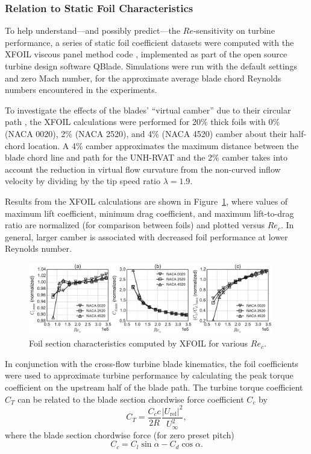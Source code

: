 \documentclass[energies,article,accept,moreauthors,pdftex,12pt,a4paper]{mdpi}
\begin{document}
\subsubsection{Relation to Static Foil Characteristics}

To help understand---and possibly predict---the $Re$-sensitivity on turbine
performance, a series of static foil coefficient datasets were computed with the
XFOIL viscous panel method code \cite{Drela1989}, implemented as part of the
open source turbine design software QBlade. Simulations were run with the
default settings and zero Mach number, for the approximate average blade chord
Reynolds numbers encountered in the experiments.

To investigate the effects of the blades' ``virtual camber'' due to their
circular path \cite{Migliore1980}, the XFOIL calculations were performed for
20\% thick foils with 0\% (NACA 0020), 2\% (NACA 2520), and 4\% (NACA 4520)
camber about their half-chord location. A 4\% camber approximates the maximum
distance between the blade chord line and path for the UNH-RVAT and the 2\%
camber takes into account the reduction in virtual flow curvature from the
non-curved inflow velocity by dividing by the tip speed ratio $\lambda=1.9$.

Results from the XFOIL calculations are shown in Figure~\ref{fig:foil-Re-dep},
where values of maximum lift coefficient, minimum drag coefficient, and maximum
lift-to-drag ratio are normalized (for comparison between foils) and plotted
versus $Re_c$. In general, larger camber is associated with decreased foil
performance at lower Reynolds number.

\begin{figure}[ht]
\centering
\includegraphics[width=0.95\textwidth]{figures/all_foils_re_dep}
\caption{Foil section characteristics computed by XFOIL for various $Re_c$.}
\label{fig:foil-Re-dep}
\end{figure}

In conjunction with the cross-flow turbine blade kinematics, the foil
coefficients were used to approximate turbine performance by calculating the
peak torque coefficient on the upstream half of the blade path. The turbine
torque coefficient $C_T$ can be related to the blade section chordwise force
coefficient $C_c$ by
\begin{equation}
C_T = \frac{C_c c}{2R} \frac{|U_\mathrm{rel}|^2}{U_\infty^2},
\end{equation}
where the blade section chordwise force (for zero preset pitch)
\begin{equation}
C_c = C_l \sin \alpha - C_d \cos \alpha.
\end{equation}
\end{document}

